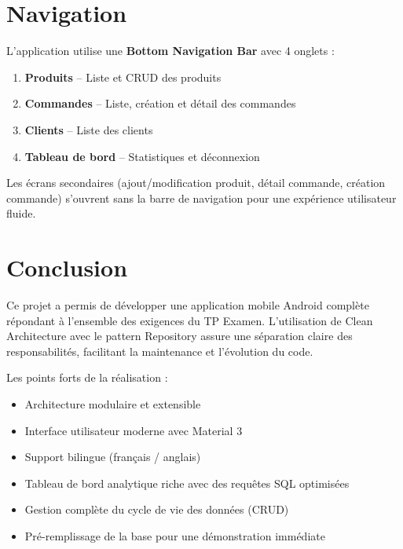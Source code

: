 \documentclass[12pt,a4paper]{article}
\begin{document}
\section{Navigation}

L'application utilise une \textbf{Bottom Navigation Bar} avec 4 onglets :
\begin{enumerate}
    \item \textbf{Produits} -- Liste et CRUD des produits
    \item \textbf{Commandes} -- Liste, cr\'eation et d\'etail des commandes
    \item \textbf{Clients} -- Liste des clients
    \item \textbf{Tableau de bord} -- Statistiques et d\'econnexion
\end{enumerate}

Les \'ecrans secondaires (ajout/modification produit, d\'etail commande, cr\'eation commande) s'ouvrent sans la barre de navigation pour une exp\'erience utilisateur fluide.

\section{Conclusion}

Ce projet a permis de d\'evelopper une application mobile Android compl\`ete r\'epondant \`a l'ensemble des exigences du TP Examen. L'utilisation de Clean Architecture avec le pattern Repository assure une s\'eparation claire des responsabilit\'es, facilitant la maintenance et l'\'evolution du code.

Les points forts de la r\'ealisation :
\begin{itemize}
    \item Architecture modulaire et extensible
    \item Interface utilisateur moderne avec Material 3
    \item Support bilingue (fran\c{c}ais / anglais)
    \item Tableau de bord analytique riche avec des requ\^etes SQL optimis\'ees
    \item Gestion compl\`ete du cycle de vie des donn\'ees (CRUD)
    \item Pr\'e-remplissage de la base pour une d\'emonstration imm\'ediate
\end{itemize}
\end{document}
